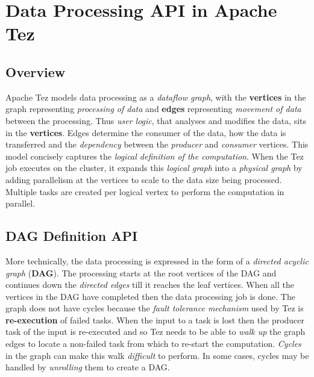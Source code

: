 \documentclass[twocolumn]{article}
\begin{document}



\section{Data Processing API in Apache Tez}
\subsection{Overview}

Apache Tez models data processing as a \emph{dataflow graph}, with the
\textbf{vertices} in the graph representing \emph{processing of data}
and \textbf{edges} representing \emph{movement of data} between the
processing. Thus \emph{user logic}, that analyses and modifies the data,
sits in the \textbf{vertices}. Edges determine the consumer of the data,
how the data is transferred and the \emph{dependency} between the
\emph{producer} and \emph{consumer} vertices. This model concisely
captures the \emph{logical definition of the computation}. When the Tez
job executes on the cluster, it expands this \emph{logical graph} into a
\emph{physical graph} by adding parallelism at the vertices to scale to
the data size being processed. Multiple tasks are created per logical
vertex to perform the computation in parallel.

\subsection{DAG Definition API}

More technically, the data processing is expressed in the form of a
\emph{directed acyclic graph} (\textbf{DAG}). The processing starts at
the root vertices of the DAG and continues down the \emph{directed
edges} till it reaches the leaf vertices. When all the vertices in the
DAG have completed then the data processing job is done. The graph does
not have cycles because the \emph{fault tolerance mechanism} used by Tez
is \textbf{re-execution} of failed tasks. When the input to a task is
lost then the producer task of the input is re-executed and so Tez needs
to be able to \emph{walk up} the graph edges to locate a non-failed task
from which to re-start the computation. \emph{Cycles} in the graph can
make this walk \emph{difficult} to perform. In some cases, cycles may be
handled by \emph{unrolling} them to create a DAG.
\end{document}
